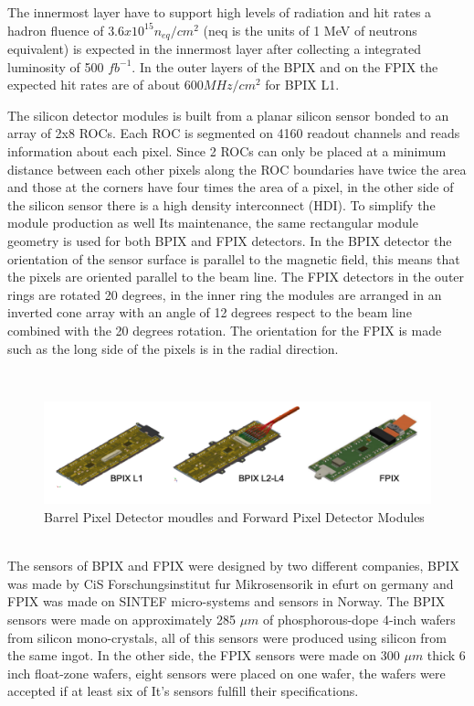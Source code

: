The innermost layer have to support high levels of radiation and hit rates a hadron fluence of $3.6x10^{15} n_{eq}/cm^{2}$ (neq is the units of 1 MeV of neutrons equivalent) is expected in the innermost layer after collecting a integrated luminosity of 500 $fb^{-1}$. In the outer layers of the BPIX and on the FPIX the expected hit rates are of about $600 MHz/cm^{2}$ for BPIX L1. 

The silicon detector modules is built from a planar silicon sensor bonded to an array of 2x8 ROCs. Each ROC is segmented on 4160 readout channels and reads information about each pixel. Since 2 ROCs can only be placed at a minimum distance between each other pixels along the ROC boundaries have twice the area and those at the corners have four times the area of a pixel, in the other side of the silicon sensor there is a high density interconnect (HDI). To simplify the module production as well Its maintenance, the same rectangular module geometry is used for both BPIX and FPIX detectors. In the BPIX detector the orientation of the sensor surface is parallel to the magnetic field, this means that the pixels are oriented parallel to the beam line. The FPIX detectors in the outer rings are rotated 20 degrees, in the inner ring the modules are arranged in an inverted cone array with an angle of 12 degrees respect to the beam line combined with the 20 degrees rotation. The orientation for the FPIX is made such as the long side of the pixels is in the radial direction.  

\\
\begin{figure}[h]
    \centering
    \includegraphics[width=1\textwidth]{BPIXFPIX.png}
    \caption{Barrel Pixel Detector moudles and Forward Pixel Detector Modules}
    \label{fig:BPIXFPIX}
\end{figure}

\\
The sensors of BPIX and FPIX were designed by two different companies, BPIX was made by CiS Forschungsinstitut fur Mikrosensorik in efurt on germany and FPIX was made on SINTEF micro-systems and sensors in Norway. The BPIX sensors were made on approximately 285 $\mu m$ of phosphorous-dope 4-inch wafers from silicon mono-crystals, all of this sensors were produced using silicon from the same ingot. In the other side, the FPIX sensors were made on 300 $\mu m$ thick 6 inch float-zone wafers, eight sensors were placed on one wafer, the wafers were accepted if at least six of It's sensors fulfill their specifications. 


